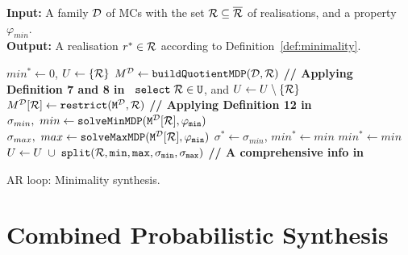 \begin{algorithm}[h!]
\hspace*{\algorithmicindent} \textbf{Input:} A family $\mathcal{D}$ of MCs with the set $\mathcal{R} \subseteq \overline{\mathcal{R}}$ of realisations, and a property $\varphi_{min}$. \\
\hspace*{\algorithmicindent} \textbf{Output:}  A realisation $r^* \in \mathcal{R}$ according to Definition~\ref{def:minimality}. \\
\vspace*{-1.5em}
\begin{algorithmic}[1]
    \STATE $min^* \leftarrow 0$, $U \leftarrow \{ \mathcal{R} \}$
    \STATE $M^{\mathcal{D}} \leftarrow \mathtt{buildQuotientMDP(\mathcal{D}, \mathcal{R})}$ \hfill \textbf{// Applying Definition 7 and 8 in~\cite{cegar}}
        \STATE $\mathtt{select \; \mathcal{R} \in U}$, and $U \leftarrow U \setminus \{ \mathcal{R} \}$
        \STATE $M^{\mathcal{D}}[\mathcal{R}] \leftarrow \mathtt{restrict(M^{\mathcal{D}}, \mathcal{R})}$ \hfill \textbf{// Applying Definition 12 in~\cite{cegar}}
        \STATE $\sigma_{min}, \ min \leftarrow \mathtt{solveMinMDP(M^{\mathcal{D}}[\mathcal{R}], \varphi_{min})}$
        \STATE $\sigma_{max}, \ max \leftarrow \mathtt{solveMaxMDP(M^{\mathcal{D}}[\mathcal{R}], \varphi_{min})}$
                \STATE $\sigma^* \leftarrow \sigma_{min}$, $min^* \leftarrow min$
            \ELSE
                    \STATE $min^* \leftarrow min$
                \ENDIF
                \STATE $U \leftarrow U \; \cup \; \mathtt{split(\mathcal{R}, min, max, \sigma_{min}, \sigma_{max})}$ \hfill \textbf{// A comprehensive info in~\cite{cegar}}
            \ENDIF
        \ENDIF
    \ENDWHILE
\end{algorithmic}
\caption{AR loop: Minimality synthesis.}
\label{alg:ar_optimal}
\end{algorithm}


\chapter{Combined Probabilistic Synthesis}\label{chap:combined}


\chapter{\toolname{}}\label{chap:paynt}

